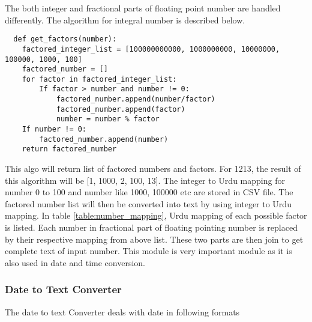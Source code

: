 The both integer and fractional parts of floating point number are handled differently. The algorithm for integral number is described below.

\begin{verbatim}
  def get_factors(number):
    factored_integer_list = [100000000000, 1000000000, 10000000, 100000, 1000, 100]
    factored_number = []
    for factor in factored_integer_list:
        If factor > number and number != 0:
            factored_number.append(number/factor)
            factored_number.append(factor)
            number = number % factor  
    If number != 0:
        factored_number.append(number)
    return factored_number

\end{verbatim}

This algo will return list of factored numbers and factors. For 1213, the result of this algorithm will be 
[1, 1000, 2, 100, 13]. The integer to Urdu mapping for number 0 to 100 and number like 1000, 100000 etc are 
stored in CSV file. The factored number list will then be converted into text by using integer to Urdu mapping. In table \ref{table:number_mapping}, Urdu mapping of each possible factor is listed. Each number in fractional part of floating pointing number is replaced by their respective mapping from above list. 
These two parts are then join to get complete text of input number. This module is very important module as it is also used in date and time conversion.  

\subsubsection{Date to Text Converter}

The date to text Converter deals with date in following formats


